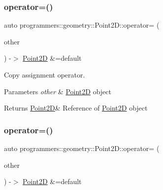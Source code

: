 \subsubsection{\texorpdfstring{operator=()}{operator=()}\hspace{0.1cm}{\footnotesize\ttfamily [1/2]}}
{\footnotesize\ttfamily auto programmers\+::geometry\+::\+Point2\+D\+::operator= (\begin{DoxyParamCaption}\item[{const \hyperlink{classprogrammers_1_1geometry_1_1Point2D}{Point2D} \&}]{other }\end{DoxyParamCaption}) -\/$>$  \hyperlink{classprogrammers_1_1geometry_1_1Point2D}{Point2D} \&=default\hspace{0.3cm}{\ttfamily [default]}}



Copy assignment operator. 


\begin{DoxyParams}{Parameters}
{\em other} & \hyperlink{classprogrammers_1_1geometry_1_1Point2D}{Point2D} object \\
\hline
\end{DoxyParams}
\begin{DoxyReturn}{Returns}
\hyperlink{classprogrammers_1_1geometry_1_1Point2D}{Point2D}\& Reference of \hyperlink{classprogrammers_1_1geometry_1_1Point2D}{Point2D} object 
\end{DoxyReturn}
\mbox{\label{classprogrammers_1_1geometry_1_1Point2D_ac5ceadc06a745b1189fceff65eda53b0}} 
\subsubsection{\texorpdfstring{operator=()}{operator=()}\hspace{0.1cm}{\footnotesize\ttfamily [2/2]}}
{\footnotesize\ttfamily auto programmers\+::geometry\+::\+Point2\+D\+::operator= (\begin{DoxyParamCaption}\item[{\hyperlink{classprogrammers_1_1geometry_1_1Point2D}{Point2D} \&\&}]{other }\end{DoxyParamCaption}) -\/$>$  \hyperlink{classprogrammers_1_1geometry_1_1Point2D}{Point2D} \&=default\hspace{0.3cm}{\ttfamily [default]}}



